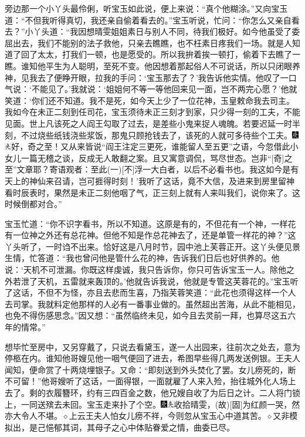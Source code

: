 旁边那一个小丫头最伶俐，听宝玉如此说，便上来说：“真个他糊涂。”又向宝玉道：“不但我听得真切，我还亲自偷着看去的。”宝玉听说，忙问：“你怎么又亲自看去？”小丫头道：“我因想晴雯姐姐素日与别人不同，待我们极好。如今他虽受了委屈出去，我们不能别的法子救他，只亲去瞧瞧，也不枉素日疼我们一场。就是人知道了回了太太，打我们一顿，也是愿受的。所以我拚着挨一顿打，偷着下去瞧了一瞧。谁知他平生为人聪明，至死不变。他因想着那起俗人不可说话，所以只闭眼养神，见我去了便睁开眼，拉我的手问：‘宝玉那去了？’我告诉他实情。他叹了一口气说：‘不能见了。’我就说：‘姐姐何不等一等他回来见一面，岂不两完心愿？’他就笑道：‘你们还不知道。我不是死，如今天上少了一位花神，玉皇敕命我去司主。我如今在未正二刻到任司花，宝玉须待未正三刻才到家，只少得一刻的工夫，不能见面。世上凡该死之人阎王勾取了过去，是差些小鬼来捉人魂魄。若要迟延一时半刻，不过烧些纸钱浇些浆饭，那鬼只顾抢钱去了，该死的人就可多待些个工夫。{\includegraphics[width=3mm]{../Images/00004}\includegraphics[width=3mm]{../Images/00012}\footnotesize \kaishu 好，奇之至！又从来皆说“阎王注定三更死，谁能留人至五更”之语，今忽借此小女儿一篇无稽之谈，反成无人敢翻之案。且又寓意调侃，骂尽世态。岂非“{[}奇{]}之至”文章耶？寄语观者：至此{(一)}{[}不{]}浮一大白者，以后不必看书也。}我这如今是有天上的神仙来召请，岂可捱得时刻！’我听了这话，竟不大信，及进来到房里留神看时辰表时，果然是未正二刻他咽了气，正三刻上就有人来叫我们，说你来了。这时候倒都对合。”

宝玉忙道：“你不识字看书，所以不知道。这原是有的，不但花有一个神，一样花有一位神之外还有总花神。但他不知是作总花神去了，还是单管一样花的神？”这丫头听了，一时诌不出来。恰好这是八月时节，园中池上芙蓉正开。这丫头便见景生情，忙答道：“我也曾问他是管什么花的神，告诉我们日后也好供养的。他说：‘天机不可泄漏。你既这样虔诚，我只告诉你，你只可告诉宝玉一人。除他之外若泄了天机，五雷就来轰顶的。’他就告诉我说，他就是专管这芙蓉花的。”宝玉听了这话，不但不为怪，亦且去悲而生喜，乃指芙蓉笑道：“此花也须得这样一个人去司掌。我就料定他那样的人必有一番事业做的。虽然超出苦海，从此不能相见，也免不得伤感思念。”因又想：“虽然临终未见，如今且去灵前一拜，也算尽这五六年的情常。”

想毕忙至房中，又另穿戴了，只说去看黛玉，遂一人出园来，往前次之处去，意为停柩在内。谁知他哥嫂见他一咽气便回了进去，希图早些得几两发送例银。王夫人闻知，便命赏了十两烧埋银子。又命：“即刻送到外头焚化了罢。女儿痨死的，断不可留！”他哥嫂听了这话，一面得银，一面就雇了人来入殓，抬往城外化人场上去了。剩的衣履簪环，约有三四百金之数，他兄嫂自收了为后日之计。二人将门锁上，一同送殡去未回。宝玉走来扑了个空。{\includegraphics[width=3mm]{../Images/00004}\includegraphics[width=3mm]{../Images/00012}\footnotesize \kaishu 收拾晴雯，{(故)}{[}固{]}为红颜一哭，然亦大令人不堪。{$\diamond$}上云王夫人怕女儿痨不祥，今则忽从宝玉心中道其苦。{$\diamond$}又非模拟出，是己悒郁其词，其母子之心中体贴眷爱之情，曲委已尽。}

